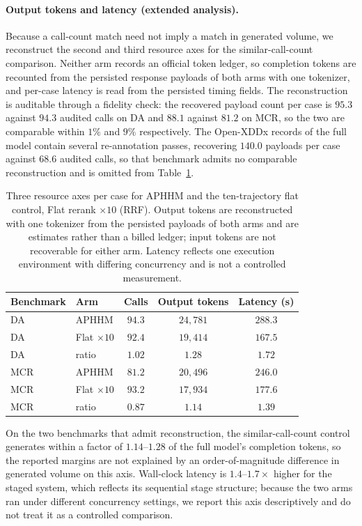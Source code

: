 \documentclass[letterpaper]{article}
\begin{document}
\paragraph{Output tokens and latency (extended analysis).}
Because a call-count match need not imply a match in generated volume, we reconstruct the second and third resource axes for the similar-call-count comparison.
Neither arm records an official token ledger, so completion tokens are recounted from the persisted response payloads of both arms with one tokenizer, and per-case latency is read from the persisted timing fields.
The reconstruction is auditable through a fidelity check: the recovered payload count per case is $95.3$ against $94.3$ audited calls on DA and $88.1$ against $81.2$ on MCR, so the two are comparable within $1\%$ and $9\%$ respectively.
The Open-XDDx records of the full model contain several re-annotation passes, recovering $140.0$ payloads per case against $68.6$ audited calls, so that benchmark admits no comparable reconstruction and is omitted from Table~\ref{tab:resource-axes}.

\begin{table}[tb]
\centering
\small
\begin{tabular}{@{}llccc@{}}
\toprule
Benchmark & Arm & Calls & Output tokens & Latency (s) \\
\midrule
DA & APHHM & $94.3$ & $24{,}781$ & $288.3$ \\
DA & Flat $\times 10$ & $92.4$ & $19{,}414$ & $167.5$ \\
DA & ratio & $1.02$ & $1.28$ & $1.72$ \\
\midrule
MCR & APHHM & $81.2$ & $20{,}496$ & $246.0$ \\
MCR & Flat $\times 10$ & $93.2$ & $17{,}934$ & $177.6$ \\
MCR & ratio & $0.87$ & $1.14$ & $1.39$ \\
\bottomrule
\end{tabular}
\caption{Three resource axes per case for APHHM and the ten-trajectory flat control, Flat rerank $\times 10$ (RRF). Output tokens are reconstructed with one tokenizer from the persisted payloads of both arms and are estimates rather than a billed ledger; input tokens are not recoverable for either arm. Latency reflects one execution environment with differing concurrency and is not a controlled measurement.}
\label{tab:resource-axes}
\end{table}

On the two benchmarks that admit reconstruction, the similar-call-count control generates within a factor of $1.14$--$1.28$ of the full model's completion tokens, so the reported margins are not explained by an order-of-magnitude difference in generated volume on this axis.
Wall-clock latency is $1.4$--$1.7\times$ higher for the staged system, which reflects its sequential stage structure; because the two arms ran under different concurrency settings, we report this axis descriptively and do not treat it as a controlled comparison.
\end{document}
